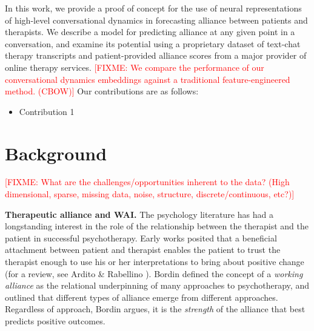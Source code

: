 \documentclass{article}
\newcommand{\fixme}[1]{\textcolor{red}{[FIXME: #1]}}
\begin{document}
In this work, we provide a proof of concept for the use of neural representations of high-level conversational dynamics in forecasting alliance between patients and therapists. We describe a model for predicting alliance at any given point in a conversation, and examine its potential using a proprietary dataset of text-chat therapy transcripts and patient-provided alliance scores from a major provider of online therapy services. \fixme{We compare the performance of our conversational dynamics embeddings against a traditional feature-engineered method. (CBOW)} Our contributions are as follows:

\begin{itemize}
  \item Contribution 1
\end{itemize}

\section{Background}
\label{sec:background}

\fixme{What are the challenges/opportunities inherent to the data? (High dimensional, sparse, missing data, noise, structure, discrete/continuous, etc?)}

\textbf{Therapeutic alliance and WAI.} The psychology literature has had a longstanding interest in the role of the relationship between the therapist and the patient in successful psychotherapy. Early works posited that a beneficial attachment between patient and therapist enables the patient to trust the therapist enough to use his or her interpretations to bring about positive change (for a review, see Ardito \& Rabellino \citeyear{ardito2011therapeutic}). Bordin \citeyear{bordin1979generalizability} defined the concept of a \textit{working alliance} as the relational underpinning of many approaches to psychotherapy, and outlined that different types of alliance emerge from different approaches. Regardless of approach, Bordin argues, it is the \textit{strength} of the alliance that best predicts positive outcomes.
\end{document}
